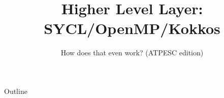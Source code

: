 \documentclass[aspectratio=169]{beamer}
\title{Higher Level Layer: SYCL/OpenMP/Kokkos}
\subtitle{How does that even work? (ATPESC edition)}
\begin{document}
\maketitle

\begin{frame}{Outline}
\tableofcontents[hideallsubsections]
\end{frame}




\end{document}
